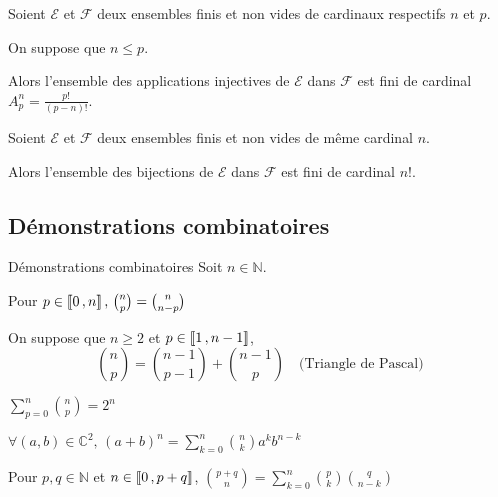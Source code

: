     \begin{prop}{}{}
        Soient $\mathcal{E}$ et $\mathcal{F}$ deux ensembles finis et non vides de cardinaux respectifs $n$ et $p$.

        On suppose que $n \leq p$.

        Alors l’ensemble des applications injectives de $\mathcal{E}$ dans $\mathcal{F}$ est fini de cardinal $A_p^n = \frac{p!}{(p-n)!}$.
    \end{prop}

    \begin{coro}{}{}
        Soient $\mathcal{E}$ et $\mathcal{F}$ deux ensembles finis et non vides de même cardinal $n$.

        Alors l’ensemble des bijections de $\mathcal{E}$ dans $\mathcal{F}$ est fini de cardinal $n!$.
    \end{coro}

    \subsection{Démonstrations combinatoires}

    \begin{prop}{Démonstrations combinatoires}{}
        Soit $n \in \mathbb{N}$.

        \begin{alors}
            \item Pour $p \in \left\llbracket 0 \, , n \right\rrbracket, \, \binom{n}{p} = \binom{n}{n-p}$
            \item On suppose que $n \geq 2$ et $p \in \left\llbracket 1 \, , n-1 \right\rrbracket$, \[ \binom{n}{p} = \binom{n-1}{p-1} + \binom{n-1}{p} \quad \text{(Triangle de Pascal)} \]
            \item $\sum\limits_{p=0}^n \binom{n}{p} = 2^n$
            \item $\forall (a,b) \in \mathbb{C}^2, \, (a+b)^n = \sum\limits_{k=0}^n \binom{n}{k} a^k b^{n-k}$
            \item Pour $p,q \in \mathbb{N}$ et $n \in \left\llbracket 0 \, , p+q \right\rrbracket$, $\binom{p+q}{n} = \sum\limits_{k=0}^n \binom{p}{k} \binom{q}{n-k}$
        \end{alors}
    \end{prop}

